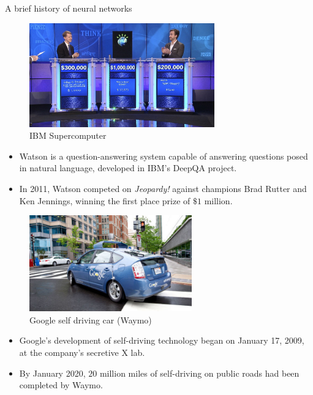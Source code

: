 \begin{vbframe}{A brief history of neural networks}
\begin{figure}
\centering
\includegraphics[width=8cm]{figure/ibmsupercomputer.jpg}
\caption{IBM Supercomputer}
\end{figure}
\footnotesize
\begin{itemize}
\item Watson is a question-answering system capable of answering questions posed in natural language, developed in IBM's DeepQA project.
\vspace{.1cm}
\item In 2011, Watson competed on \textit{Jeopardy!} against champions Brad Rutter and Ken Jennings, winning the first place prize of $\$ 1$ million.
\end{itemize}
\framebreak

\begin{figure}
\centering
\includegraphics[width=7cm]{figure/selfdriving.jpg}
\caption{Google self driving car (Waymo)}
\end{figure}
\footnotesize
\begin{itemize}
\item Google's development of self-driving technology began on January 17, 2009, at the company's secretive X lab.
\vspace{.1cm}
\item By January 2020, $20$ million miles of self-driving on public roads had been completed by Waymo.
\end{itemize}
\framebreak


\end{vbframe}
